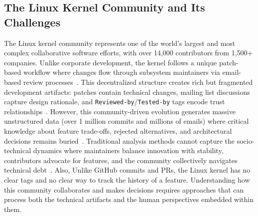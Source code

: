 \documentclass[sigconf,review,anonymous]{acmart}
\begin{document}
\subsection{The Linux Kernel Community and Its Challenges}
The Linux kernel community represents one of the world's largest and most complex collaborative software efforts, with over 14,000 contributors from 1,500+ companies. Unlike corporate development, the kernel follows a unique patch-based workflow where changes flow through subsystem maintainers via email-based review processes~\cite{tan2019communicate}. This decentralized structure creates rich but fragmented development artifacts: patches contain technical changes, mailing list discussions capture design rationale, and \texttt{Reviewed-by}/\texttt{Tested-by} tags encode trust relationships~\cite{kerneldocs-submitting}. However, this community-driven evolution generates massive unstructured data (over 1 million commits and millions of emails) where critical knowledge about feature trade-offs, rejected alternatives, and architectural decisions remains buried~\cite{israeli2010linux}. Traditional analysis methods cannot capture the socio-technical dynamics where maintainers balance innovation with stability, contributors advocate for features, and the community collectively navigates technical debt~\cite{brown2010managing}. Also, Unlike GitHub commits and PRs, the Linux kernel has no clear tags and no clear way to track the history of a feature. Understanding how this community collaborates and makes decisions requires approaches that can process both the technical artifacts and the human perspectives embedded within them.



\end{document}
